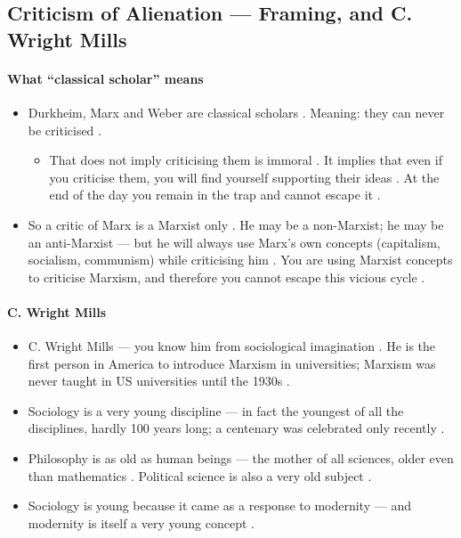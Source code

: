 \subsection{Criticism of Alienation --- Framing, and C. Wright Mills}

\paragraph{What ``classical scholar'' means}
\begin{itemize}
    \item Durkheim, Marx and Weber are classical scholars . Meaning: they can never be criticised .
    \begin{itemize}
        \item That does not imply criticising them is immoral . It implies that even if you criticise them, you will find yourself supporting their ideas . At the end of the day you remain in the trap and cannot escape it .
    \end{itemize}
    \item So a critic of Marx is a Marxist only . He may be a non-Marxist; he may be an anti-Marxist --- but he will always use Marx's own concepts (capitalism, socialism, communism) while criticising him . You are using Marxist concepts to criticise Marxism, and therefore you cannot escape this vicious cycle .
\end{itemize}

\paragraph{C. Wright Mills}
\begin{itemize}
    \item C. Wright Mills --- you know him from sociological imagination . He is the first person in America to introduce Marxism in universities; Marxism was never taught in US universities until the 1930s .
\end{itemize}

\begin{DataFact}
\begin{itemize}
    \item Sociology is a very young discipline --- in fact the youngest of all the disciplines, hardly 100 years long; a centenary was celebrated only recently .
    \item Philosophy is as old as human beings --- the mother of all sciences, older even than mathematics . Political science is also a very old subject .
    \item Sociology is young because it came as a response to modernity --- and modernity is itself a very young concept .
\end{itemize}
\end{DataFact}

